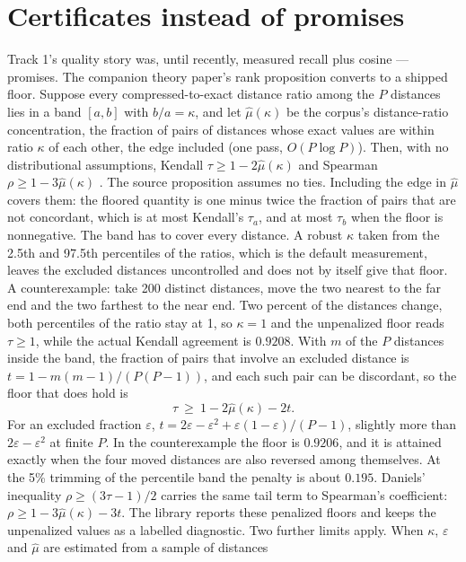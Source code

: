 \documentclass[11pt]{article}
\begin{document}
\section{Certificates instead of promises}\label{sec:cert}
Track 1's quality story was, until recently, measured recall plus cosine ---
promises. The companion theory paper's rank proposition converts to a shipped
floor. Suppose every compressed-to-exact distance ratio among the $P$ distances
lies in a band $[a,b]$ with $b/a=\kappa$, and let $\hat\mu(\kappa)$ be the corpus's
distance-ratio concentration, the fraction of pairs of distances whose exact
values are within ratio $\kappa$ of each other, the edge included (one pass,
$O(P\log P)$). Then, with no distributional assumptions, Kendall
$\tau \geq 1-2\hat\mu(\kappa)$ and Spearman $\rho \geq 1-3\hat\mu(\kappa)$
\cite{kta,daniels1950}. The source proposition assumes no ties. Including the edge
in $\hat\mu$ covers them: the floored quantity is one minus twice the fraction of
pairs that are not concordant, which is at most Kendall's $\tau_a$, and at most
$\tau_b$ when the floor is nonnegative. The band has to cover every
distance. A robust $\kappa$ taken from the 2.5th and 97.5th percentiles of the
ratios, which is the default measurement, leaves the excluded
distances uncontrolled and does not by itself give that floor. A counterexample: take 200
distinct distances, move the two nearest to the far end and the two farthest to
the near end. Two percent of the distances change, both percentiles of the ratio
stay at 1, so $\kappa=1$ and the unpenalized floor reads $\tau\ge1$, while the
actual Kendall agreement is $0.9208$. With $m$ of the $P$ distances inside the
band, the fraction of pairs that involve an excluded distance is
$t=1-m(m-1)/(P(P-1))$, and each such pair can be discordant, so the floor that
does hold is
\[
\tau\ \ge\ 1-2\hat\mu(\kappa)-2t .
\]
For an excluded fraction $\varepsilon$,
$t=2\varepsilon-\varepsilon^2+\varepsilon(1-\varepsilon)/(P-1)$, slightly more
than $2\varepsilon-\varepsilon^2$ at finite $P$. In the counterexample the floor
is $0.9206$, and it is attained exactly when the four moved distances are also
reversed among themselves. At the 5\% trimming of the percentile band the
penalty is about $0.195$. Daniels' inequality $\rho\ge(3\tau-1)/2$ carries the
same tail term to Spearman's coefficient: $\rho\ge1-3\hat\mu(\kappa)-3t$. The
library reports these penalized floors and keeps the unpenalized values as a
labelled diagnostic. Two further limits apply. When
$\kappa$, $\varepsilon$ and $\hat\mu$ are estimated from a sample of distances
\end{document}
